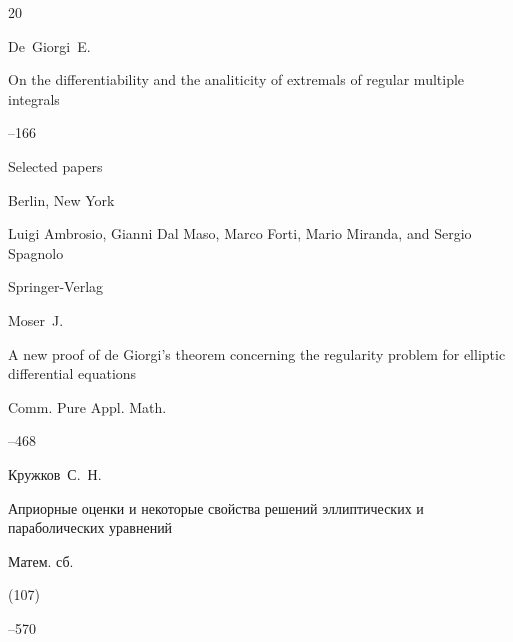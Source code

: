 \begin{thebibliography}{20}

\transl

\by  De~Giorgi~E.

\paper On the differentiability and the analiticity of extremals of regular multiple integrals

--166


\inbook Selected papers

\publaddr Berlin, New York

\eds Luigi Ambrosio, Gianni Dal Maso, Marco Forti, Mario Miranda, and Sergio Spagnolo

\publ Springer-Verlag








\by  Moser~J.

\paper A new proof of de Giorgi's theorem concerning the regularity problem for elliptic differential equations

\jour Comm. Pure Appl. Math.




--468







\by Кружков~С.~Н.

\paper Априорные оценки и некоторые свойства решений эллиптических и параболических уравнений

\jour Матем. сб.


(107)


--570











\end{thebibliography}
